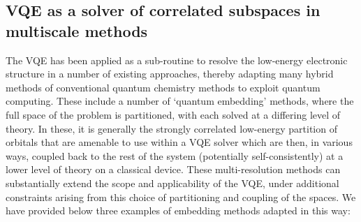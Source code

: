 
\subsection{VQE as a solver of correlated subspaces in multiscale methods} \label{sec:multiscale}

The VQE has been applied as a sub-routine to resolve the low-energy electronic structure in a number of existing approaches, thereby adapting many hybrid methods of conventional quantum chemistry methods to exploit quantum computing. These include a number of `quantum embedding' methods, where the full space of the problem is partitioned, with each solved at a differing level of theory. In these, it is generally the strongly correlated low-energy partition of orbitals that are amenable to use within a VQE solver which are  then, in various ways, coupled back to the rest of the system (potentially self-consistently) at a lower level of theory on a classical device. These multi-resolution methods can substantially extend the scope and applicability of the VQE, under additional constraints arising from this choice of partitioning and coupling of the spaces. We have provided below three examples of embedding methods adapted in this way:

